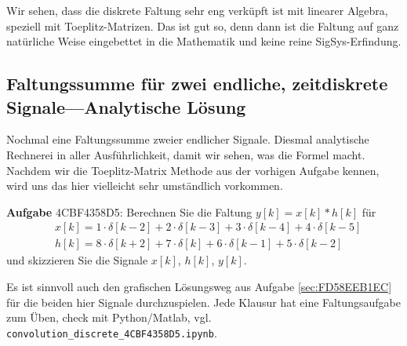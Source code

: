 Wir sehen, dass die diskrete Faltung sehr eng verküpft ist mit linearer Algebra, speziell
mit Toeplitz-Matrizen. Das ist gut so, denn dann ist die Faltung auf ganz natürliche Weise
eingebettet in die Mathematik und keine reine SigSys-Erfindung.




\newpage
\subsection{Faltungssumme für zwei endliche, zeitdiskrete Signale---Analytische Lösung}
\label{sec:4CBF4358D5}
\begin{Ziel}
Nochmal eine Faltungssumme zweier endlicher Signale. Diesmal analytische
Rechnerei in aller Ausführlichkeit, damit wir sehen, was die Formel macht.
Nachdem wir die Toeplitz-Matrix Methode aus der vorhigen Aufgabe kennen, wird
uns das hier vielleicht sehr umständlich vorkommen.
\end{Ziel}
\textbf{Aufgabe} {\tiny 4CBF4358D5}: Berechnen Sie die Faltung $y[k] = x[k] * h[k]$
für
\begin{align}
&x[k] = 1\cdot\delta[k-2] + 2\cdot\delta[k-3] + 3\cdot\delta[k-4] + 4\cdot\delta[k-5]\\
&h[k] = 8\cdot\delta[k+2] + 7\cdot\delta[k]   + 6\cdot\delta[k-1] + 5\cdot\delta[k-2]
\end{align}
und skizzieren Sie die Signale $x[k]$, $h[k]$, $y[k]$.

Es ist sinnvoll auch den grafischen Lösungsweg aus Aufgabe \ref{sec:FD58EEB1EC}
für die beiden hier Signale durchzuspielen. Jede Klausur hat eine Faltungsaufgabe
zum Üben, check mit Python/Matlab, vgl. \texttt{convolution\_discrete\_4CBF4358D5.ipynb}.

